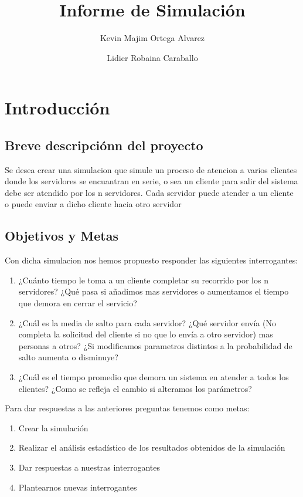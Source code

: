 \documentclass{article}
\begin{document}
\title{Informe de Simulación}
\author {Kevin Majim Ortega Alvarez \and Lidier Robaina Caraballo}
\maketitle

\section{Introducción}
\subsection{Breve descripciónn del proyecto}

Se desea crear una simulacion que simule un proceso de atencion  a varios clientes donde los servidores se encuantran en serie, o sea un cliente para
salir del sistema debe ser atendido por los n servidores. Cada servidor puede atender a un cliente o puede enviar a dicho cliente hacia otro servidor

\subsection{Objetivos y Metas}
Con dicha simulacion nos hemos propuesto responder las siguientes interrogantes:
\begin{enumerate}
\item{¿Cuánto tiempo le toma a un cliente completar su recorrido por los n servidores? ¿Qué pasa si añadimos mas servidores o aumentamos el tiempo que demora en cerrar el servicio?}
\item{¿Cuál es la media de salto para cada servidor? ¿Qué servidor envía (No completa la solicitud del cliente si no que lo envía a otro servidor) mas personas a otros? ¿Si modificamos parametros distintos a la probabilidad de salto aumenta o disminuye?}
\item{¿Cuál es el tiempo promedio que demora un sistema en atender a todos los clientes? ¿Como se refleja el cambio si alteramos los parámetros?}\\
\end{enumerate}
Para dar respuestas a las anteriores preguntas tenemos como metas:
\begin{enumerate}
\item{Crear la simulación}
\item{Realizar el análisis estadístico de los resultados obtenidos de la simulación}
\item{Dar respuestas a nuestras interrogantes}
\item{Plantearnos nuevas interrogantes}
\end{enumerate}
\end{document}
